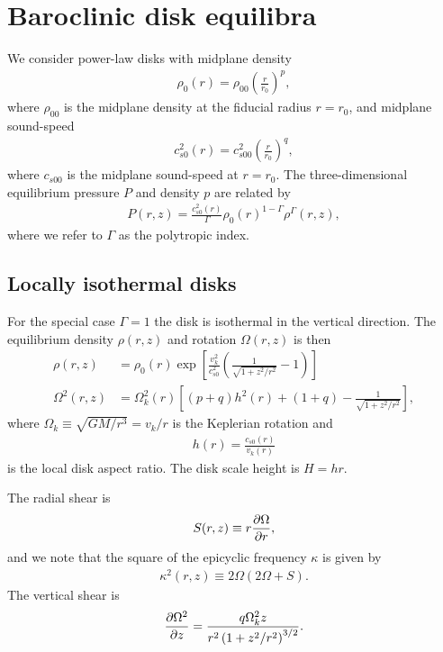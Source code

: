  \section{Baroclinic disk equilibra}
 We consider power-law disks with midplane density
 \begin{align}
   \rho_0(r) = \rho_{00}\left(\frac{r}{r_0}\right)^p,
 \end{align}
 where $\rho_{00}$ is the midplane density at the fiducial radius
 $r=r_0$, and midplane sound-speed 
 \begin{align}
   c_{s0}^2(r)=c_{s00}^2\left(\frac{r}{r_0}\right)^q, 
 \end{align}
 where $c_{s00}$ is the midplane sound-speed at $r=r_0$. 
 The three-dimensional equilibrium pressure $P$ and density $p$ are
 related by 
 \begin{align}
   P(r,z) = 
   \frac{c_{s0}^2(r)}{\Gamma}\rho_0(r)^{1-\Gamma}\rho^\Gamma(r,z), 
 \end{align}
 where we refer to $\Gamma$ as the polytropic index. 
 
 \subsection{Locally isothermal disks}
 For the special case $\Gamma=1$ the disk is isothermal in the
 vertical direction. The equilibrium density $\rho(r,z)$ and rotation
 $\Omega(r,z)$ is then 
 \begin{align}
   \rho(r,z) &=
   \rho_0(r)\exp{\left[\frac{v_k^2}{c_{s0}^2}\left(\frac{1}{\sqrt{1+z^2/r^2}}-1\right)\right]}\\   
   \Omega^2(r,z)& = \Omega_k^2(r) \left[(p+q)h^2(r) + (1 + q) -
     \frac{1}{\sqrt{1+z^2/r^2}}\right],
 \end{align}
 where $\Omega_k\equiv\sqrt{GM/r^3}=v_k/r$ is the Keplerian rotation 
 and 
 \begin{align}
   h(r) = \frac{c_{s0}(r)}{v_k(r)} 
 \end{align}
 is the local disk aspect ratio. The disk scale height is $H=hr$. 
 
 The radial shear is 
 \begin{align}
   S(r,z) \equiv r\frac{\partial\Omega}{\partial r},  
 \end{align}
 and we note that the square of the epicyclic frequency $\kappa$ is
 given by
 \begin{align}
   \kappa^2(r,z) \equiv 2\Omega(2\Omega + S). 
 \end{align}
 The vertical shear is 
 \begin{align}
   \frac{\partial\Omega^2}{\partial z} =
   \frac{q\Omega_k^2z}{r^2\left(1+z^2/r^2\right)^{3/2}}. 
 \end{align}
 
